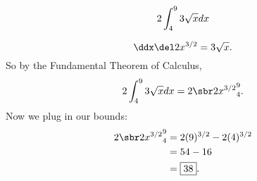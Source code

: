 \renewcommand{\avibounds}{_4^9}
\renewcommand{\avifn}{3 \sqrt{x}}
\renewcommand{\avianti}{2 x^{3/2}}

\begin{probboxed}
    \[
        \aviprob{}
    \]
\end{probboxed}

\aviinversepowerrule
\[
    \ddx\del\avianti{} = \avifn{}.
\]
So by the Fundamental Theorem of Calculus,
\[
    \aviprob{}
    = \avibounded{}.
\]
Now we plug in our bounds:
\begin{align*}
    \avibounded{}
    &= 2(9)^{3/2} - 2(4)^{3/2} \\
    &= 54 - 16 \\
    &= \boxed{38}.
\end{align*}
